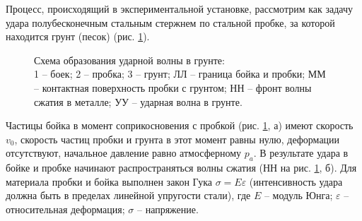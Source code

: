 \documentclass[specialist, subf, href, colorlinks=true, 14pt, final]{disser}
\theoremstyle{definition}
\begin{document}
Процесс, происходящий в экспериментальной установке, рассмотрим как задачу удара полубесконечным стальным стержнем по стальной пробке, за которой находится грунт (песок) (рис. \ref{2-4-1}).
\begin{figure}[!htp]
  \caption{Схема образования ударной волны в грунте:\\
  1 -- боек; 2 -- пробка; 3 -- грунт; ЛЛ -- граница бойка и пробки; ММ -- контактная поверхность пробки с грунтом; НН -- фронт волны сжатия в металле; УУ -- ударная волна в грунте.}
  \label{2-4-1}
\end{figure}

\newpage
Частицы бойка в момент соприкосновения с пробкой (рис. \ref{2-4-1}, а) имеют скорость $v_0$, скорость частиц пробки и грунта в этот момент равны нулю, деформации отсутствуют, начальное давление равно атмосферному $p_a$. В результате удара в бойке и пробке начинают распространяться волны сжатия (НН на рис. \ref{2-4-1}, б). Для материала пробки и бойка выполнен закон Гука $\sigma = E \varepsilon$ (интенсивность удара должна быть в пределах линейной упругости стали), где $E$ -- модуль Юнга; $\varepsilon$ -- относительная деформация; $\sigma$ -- напряжение.
\end{document}
